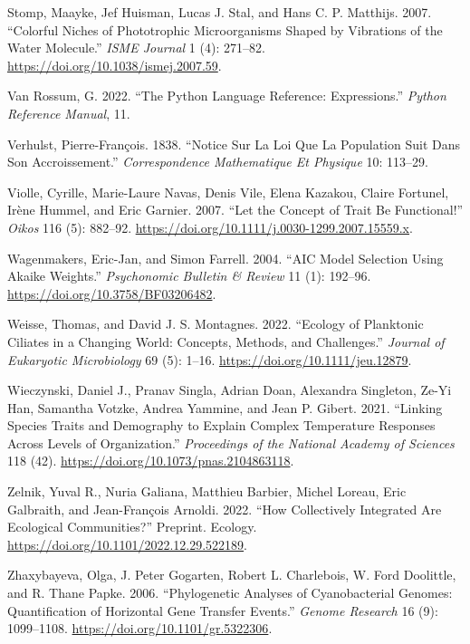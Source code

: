 \documentclass[
  letterpaper,
  DIV=11,
  numbers=noendperiod]{scrartcl}
\newlength{\cslhangindent}
\newenvironment{CSLReferences}[2] %
 {\begin{list}{}{%
  \setlength{\itemindent}{0pt}
  \setlength{\leftmargin}{0pt}
  \setlength{\parsep}{0pt}
  \ifodd #1
   \setlength{\leftmargin}{\cslhangindent}
   \setlength{\itemindent}{-1\cslhangindent}
  \fi
  \setlength{\itemsep}{#2\baselineskip}}}
 {\end{list}}
\begin{document}
\begin{CSLReferences}{1}{0}
Stomp, Maayke, Jef Huisman, Lucas J. Stal, and Hans C. P. Matthijs.
2007. {``Colorful Niches of Phototrophic Microorganisms Shaped by
Vibrations of the Water Molecule.''} \emph{ISME Journal} 1 (4): 271--82.
\url{https://doi.org/10.1038/ismej.2007.59}.

Van Rossum, G. 2022. {``The Python Language Reference: {Expressions}.''}
\emph{Python Reference Manual}, 11.

Verhulst, Pierre-François. 1838. {``Notice Sur La Loi Que La Population
Suit Dans Son Accroissement.''} \emph{Correspondence Mathematique Et
Physique} 10: 113--29.

Violle, Cyrille, Marie-Laure Navas, Denis Vile, Elena Kazakou, Claire
Fortunel, Irène Hummel, and Eric Garnier. 2007. {``Let the Concept of
Trait Be Functional!''} \emph{Oikos} 116 (5): 882--92.
\url{https://doi.org/10.1111/j.0030-1299.2007.15559.x}.

Wagenmakers, Eric-Jan, and Simon Farrell. 2004. {``{AIC} Model Selection
Using {Akaike} Weights.''} \emph{Psychonomic Bulletin \& Review} 11 (1):
192--96. \url{https://doi.org/10.3758/BF03206482}.

Weisse, Thomas, and David J. S. Montagnes. 2022. {``Ecology of
Planktonic Ciliates in a Changing World: {Concepts}, Methods, and
Challenges.''} \emph{Journal of Eukaryotic Microbiology} 69 (5): 1--16.
\url{https://doi.org/10.1111/jeu.12879}.

Wieczynski, Daniel J., Pranav Singla, Adrian Doan, Alexandra Singleton,
Ze-Yi Han, Samantha Votzke, Andrea Yammine, and Jean P. Gibert. 2021.
{``Linking Species Traits and Demography to Explain Complex Temperature
Responses Across Levels of Organization.''} \emph{Proceedings of the
National Academy of Sciences} 118 (42).
\url{https://doi.org/10.1073/pnas.2104863118}.

Zelnik, Yuval R., Nuria Galiana, Matthieu Barbier, Michel Loreau, Eric
Galbraith, and Jean-François Arnoldi. 2022. {``How Collectively
Integrated Are Ecological Communities?''} Preprint. {Ecology}.
\url{https://doi.org/10.1101/2022.12.29.522189}.

Zhaxybayeva, Olga, J. Peter Gogarten, Robert L. Charlebois, W. Ford
Doolittle, and R. Thane Papke. 2006. {``Phylogenetic Analyses of
Cyanobacterial Genomes: {Quantification} of Horizontal Gene Transfer
Events.''} \emph{Genome Research} 16 (9): 1099--1108.
\url{https://doi.org/10.1101/gr.5322306}.

\end{CSLReferences}
\end{document}
